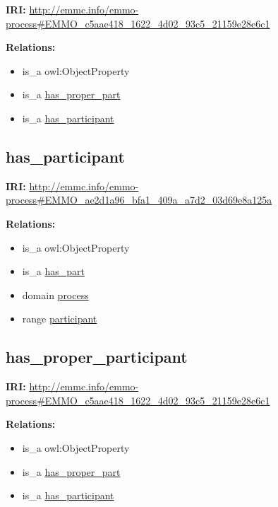\documentclass[a4paper,]{report}
\providecommand{\tightlist}{%
  \setlength{\itemsep}{0pt}\setlength{\parskip}{0pt}}
\begin{document}
\textbf{IRI:}
\url{http://emmc.info/emmo-process\#EMMO_c5aae418_1622_4d02_93c5_21159e28e6c1}

\textbf{Relations:}

\begin{itemize}
\tightlist
\item
  is\_a owl:ObjectProperty
\item
  is\_a \protect\hyperlink{has_proper_part}{has\_proper\_part}
\item
  is\_a \protect\hyperlink{has_participant}{has\_participant}
\end{itemize}

\hypertarget{has_participant}{%
\subsection{has\_participant}\label{has_participant}}

\textbf{IRI:}
\url{http://emmc.info/emmo-process\#EMMO_ae2d1a96_bfa1_409a_a7d2_03d69e8a125a}

\textbf{Relations:}

\begin{itemize}
\tightlist
\item
  is\_a owl:ObjectProperty
\item
  is\_a \protect\hyperlink{has_part}{has\_part}
\item
  domain \protect\hyperlink{process}{process}
\item
  range \protect\hyperlink{participant}{participant}
\end{itemize}

\hypertarget{has_proper_participant-1}{%
\subsection{has\_proper\_participant}\label{has_proper_participant-1}}

\textbf{IRI:}
\url{http://emmc.info/emmo-process\#EMMO_c5aae418_1622_4d02_93c5_21159e28e6c1}

\textbf{Relations:}

\begin{itemize}
\tightlist
\item
  is\_a owl:ObjectProperty
\item
  is\_a \protect\hyperlink{has_proper_part}{has\_proper\_part}
\item
  is\_a \protect\hyperlink{has_participant}{has\_participant}
\end{itemize}
\end{document}

